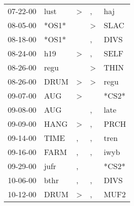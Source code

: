 \begin{supertabular}{p{0.07\textwidth}p{0.06\textwidth}p{0.02\textwidth}p{0.02\textwidth}p{0.06\textwidth}}
          07-22-00\textsuperscript{} &           lust\textsuperscript{} &     \textgreater &                , &            haj\textsuperscript{} \\
          08-05-00\textsuperscript{} &                            *OS1* &                  &     \textgreater &           SLAC\textsuperscript{} \\
          08-18-00\textsuperscript{} &                            *OS1* &                  &                , &           DIVS\textsuperscript{} \\
          08-24-00\textsuperscript{} &            h19\textsuperscript{} &     \textgreater &                , &           SELF\textsuperscript{} \\
          08-26-00\textsuperscript{} &           regu\textsuperscript{} &                  &     \textgreater &           THIN\textsuperscript{} \\
          08-26-00\textsuperscript{} &           DRUM\textsuperscript{} &     \textgreater &     \textgreater &           regu\textsuperscript{} \\
          09-07-00\textsuperscript{} &            AUG\textsuperscript{} &     \textgreater &                  &                            *CS2* \\
          09-08-00\textsuperscript{} &            AUG\textsuperscript{} &                  &                , &           late\textsuperscript{} \\
          09-09-00\textsuperscript{} &           HANG\textsuperscript{} &     \textgreater &                , &           PRCH\textsuperscript{} \\
          09-14-00\textsuperscript{} &           TIME\textsuperscript{} &                , &                , &           tren\textsuperscript{} \\
          09-16-00\textsuperscript{} &           FARM\textsuperscript{} &                , &                , &           iwyb\textsuperscript{} \\
          09-29-00\textsuperscript{} &           jufr\textsuperscript{} &                , &                  &                            *CS2* \\
          10-06-00\textsuperscript{} &           bthr\textsuperscript{} &                , &                , &           DIVS\textsuperscript{} \\
          10-12-00\textsuperscript{} &           DRUM\textsuperscript{} &     \textgreater &                , &           MUF2\textsuperscript{} \\

\end{supertabular}

